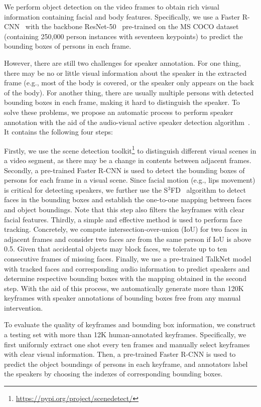 \documentclass[sigconf,camera-ready]{acmart}
\begin{document}
We perform object detection on the video frames to obtain rich visual information containing facial and body features. Specifically,  we use a Faster R-CNN~\cite{ren2015faster} with the backbone ResNet-50~\cite{he2016deep} pre-trained on the MS COCO dataset~\cite{lin2014microsoft} (containing 250,000 person instances with seventeen keypoints) to predict the bounding boxes of persons in each frame. 

However, there are still two challenges for speaker annotation. For one thing, there may be no or little visual information about the speaker in the extracted frame (e.g., most of the body is covered, or the speaker only appears on the back of the body). For another thing, there are usually multiple persons with detected bounding boxes in each frame, making it hard to distinguish the speaker. To solve these problems, we propose an automatic process to perform speaker annotation with the aid of the audio-visual active speaker detection algorithm~\cite{chung2016out,tao2021someone}. It contains the following four steps:

Firstly, we use the scene detection toolkit\footnote{\url{https://pypi.org/project/scenedetect/}} to distinguish different visual scenes in a video segment, as there may be a change in contents between adjacent frames. Secondly, a pre-trained Faster R-CNN is used to detect the bounding boxes of persons for each frame in a visual scene. Since facial motion (e.g., lips movement) is critical for detecting speakers, we further use the S$^{3}$FD~\cite{zhang2017s3fd} algorithm to detect faces in the bounding boxes and establish the one-to-one mapping between faces and object boundings. Note that this step also filters the keyframes with clear facial features. Thirdly, a simple and effective method is used to perform face tracking. Concretely, we compute intersection-over-union (IoU) for two faces in adjacent frames and consider two faces are from the same person if IoU is above 0.5. Given that accidental objects may block faces, we tolerate up to ten consecutive frames of missing faces. Finally, we use a pre-trained TalkNet model with tracked faces and corresponding audio information to predict speakers and determine respective bounding boxes with the mapping obtained in the second step. With the aid of this process, we automatically generate more than 120$\mathrm{K}$ keyframes with speaker annotations of bounding boxes free from any manual intervention. 

To evaluate the quality of keyframes and bounding box information, we construct a testing set with more than 12$\mathrm{K}$ human-annotated keyframes. Specifically, we first uniformly extract one shot every ten frames and manually select keyframes with clear visual information. Then, a pre-trained Faster R-CNN is used to predict the object boundings of persons in each keyframe, and annotators label the speakers by choosing the indexes of corresponding bounding boxes.
\end{document}
